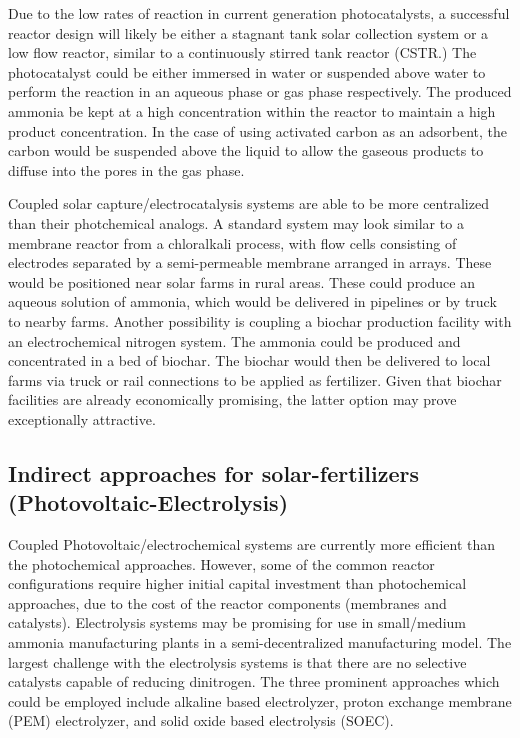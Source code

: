 Due to the low rates of reaction in current generation photocatalysts, a successful reactor design will likely be either a stagnant tank solar collection system or a low flow reactor, similar to a continuously stirred tank reactor (CSTR.) The photocatalyst could be either immersed in water or suspended above water to perform the reaction in an aqueous phase or gas phase respectively. The produced ammonia be kept at a high concentration within the reactor to maintain a high product concentration. In the case of using activated carbon as an adsorbent, the carbon would be suspended above the liquid to allow the gaseous products to diffuse into the pores in the gas phase.

Coupled solar capture/electrocatalysis systems are able to be more centralized than their photchemical analogs. A standard system may look similar to a membrane reactor from a chloralkali process, with flow cells consisting of electrodes separated by a semi-permeable membrane arranged in arrays.\cite{} These would be positioned near solar farms in rural areas. These could produce an aqueous solution of ammonia, which would be delivered in pipelines or by truck to nearby farms. Another possibility is coupling a biochar production facility with an electrochemical nitrogen system. The ammonia could be produced and concentrated in a bed of biochar. The biochar would then be delivered to local farms via truck or rail connections to be applied as fertilizer. Given that biochar facilities are already economically promising, the latter option may prove exceptionally attractive.\cite{Galinato2011}

\subsection*{Indirect approaches for solar-fertilizers (Photovoltaic-Electrolysis)}

Coupled Photovoltaic/electrochemical systems are currently more efficient than the photochemical approaches. However, some of the common reactor configurations require higher initial capital investment than photochemical approaches, due to the cost of the reactor components (membranes and catalysts). Electrolysis systems may be promising for use in small/medium ammonia manufacturing plants in a semi-decentralized manufacturing model. The largest challenge with the electrolysis systems is that there are no selective catalysts capable of reducing dinitrogen. The three prominent approaches which could be employed include alkaline based electrolyzer, proton exchange membrane (PEM) electrolyzer, and solid oxide based electrolysis (SOEC). 

